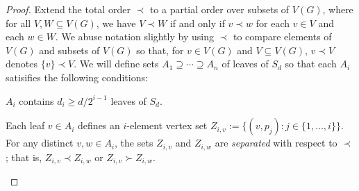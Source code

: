 \documentclass[kpfonts]{patmorin}
\renewcommand{\ge}{\geqslant}
\begin{document}
\begin{proof}
	Extend the total order $\prec$ to a partial order over subsets of $V(G)$, where for all $V,W\subseteq V(G)$, we have $V\prec W$ if and only if $v\prec w$ for each $v\in V$ and each $w\in W$.  We abuse notation slightly by using $\prec$ to compare elements of $V(G)$ and subsets of $V(G)$ so that, for $v\in V(G)$ and $V\subseteq V(G)$, $v\prec V$ denotes $\{v\}\prec V$.
    We will define sets $A_1\supseteq \cdots\supseteq A_{n}$ of leaves of $S_d$ so that each $A_i$ satisifies the following conditions:
    \begin{compactenum}[(C1)]
        \item $A_i$ contains $d_i\ge d/2^{i-1}$ leaves of $S_d$.
        \item Each leaf $v\in A_i$ defines an $i$-element vertex set $Z_{i,v}:=\{(v,p_j):j\in\{1,\ldots,i\}\}$.  For any distinct $v,w\in A_i$, the sets $Z_{i,v}$ and $Z_{i,w}$ are \emph{separated} with respect to $\prec$; that is, $Z_{i,v}\prec Z_{i,w}$ or $Z_{i,v}\succ Z_{i,w}$.
    \end{compactenum}


\end{proof}
\end{document}
